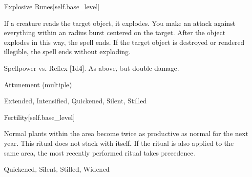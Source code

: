 \begin{spellsection}{Explosive Runes}[self.base_level]
\begin{spellcontent}
\begin{spelltargetinginfo}
\end{spelltargetinginfo}
\begin{spelleffects}
\spelleffect
If a creature reads the target object, it explodes.
You make an attack against everything within an \areamed radius burst centered on the target.
After the object explodes in this way, the spell ends.
If the target object is destroyed or rendered illegible, the spell ends without exploding.
\begin{spellattack}{Spellpower vs. Reflex}
\spellsuccess {}[1d4].
\spellcritical As above, but double damage.
\end{spellattack}
\spelldur Attunement (multiple)
\end{spelleffects}
\end{spellcontent}
\begin{spellfooter}
 Extended, Intensified, Quickened, Silent, Stilled
\end{spellfooter}
\begin{spellsubcontent}
\end{spellsubcontent}
\end{spellsection}
\begin{spellsection}{Fertility}[self.base_level]
\begin{spellcontent}
\begin{spelltargetinginfo}
\end{spelltargetinginfo}
\begin{spelleffects}
\spelleffect
Normal plants within the area become twice as productive as normal for the next year.
This ritual does not stack with itself.
If the  ritual is also applied to the same area, the most recently performed ritual takes precedence.
\end{spelleffects}
\end{spellcontent}
\begin{spellfooter}
 Quickened, Silent, Stilled, Widened
\end{spellfooter}
\begin{spellsubcontent}
\end{spellsubcontent}
\end{spellsection}
